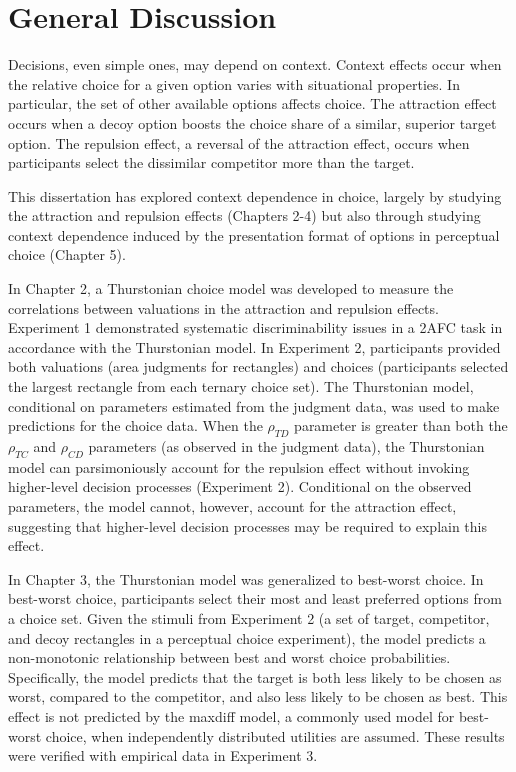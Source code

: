 \section{General Discussion}

Decisions, even simple ones, may depend on context. Context effects occur when the relative choice for a given option varies with situational properties. In particular, the set of other available options affects choice. The attraction effect occurs when a decoy option boosts the choice share of a similar, superior target option. The repulsion effect, a reversal of the attraction effect, occurs when participants select the dissimilar competitor more than the target. 

This dissertation has explored context dependence in choice, largely by studying the attraction and repulsion effects (Chapters 2-4) but also through studying context dependence induced by the presentation format of options in perceptual choice (Chapter 5).

In Chapter 2, a Thurstonian choice model was developed to measure the correlations between valuations in the attraction and repulsion effects. Experiment 1 demonstrated systematic discriminability issues in a 2AFC task in accordance with the Thurstonian model. In Experiment 2, participants provided both valuations (area judgments for rectangles) and choices (participants selected the largest rectangle from each ternary choice set). The Thurstonian model, conditional on parameters estimated from the judgment data, was used to make predictions for the choice data. When the $\rho_{TD}$ parameter is greater than both the $\rho_{TC}$ and $\rho_{CD}$ parameters (as observed in the judgment data), the Thurstonian model can parsimoniously account for the repulsion effect without invoking higher-level decision processes (Experiment 2). Conditional on the observed parameters, the model cannot, however, account for the attraction effect, suggesting that higher-level decision processes may be required to explain this effect. 

In Chapter 3, the Thurstonian model was generalized to best-worst choice. In best-worst choice, participants select their most and least preferred options from a choice set. Given the stimuli from Experiment 2 (a set of target, competitor, and decoy rectangles in a perceptual choice experiment), the model predicts a non-monotonic relationship between best and worst choice probabilities. Specifically, the model predicts that the target is both less likely to be chosen as worst, compared to the competitor, and also less likely to be chosen as best. This effect is not predicted by the maxdiff model, a commonly used model for best-worst choice, when independently distributed utilities are assumed. These results were verified with empirical data in Experiment 3.

